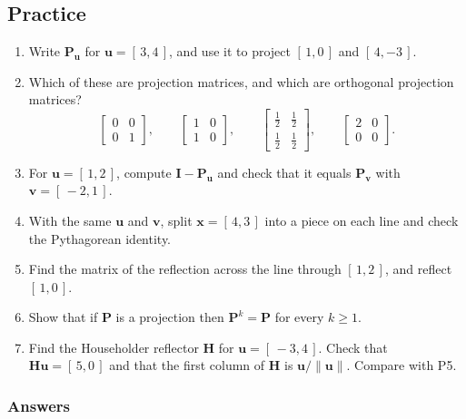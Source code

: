 \documentclass[11pt]{article}
\theoremstyle{plain}
\theoremstyle{definition}
\theoremstyle{remark}
\newcommand{\vc}[1]{\mathbf{#1}}
\newcommand{\mt}[1]{\mathbf{#1}}
\newcommand{\norm}[1]{\lVert #1\rVert}
\begin{document}
\subsection{Practice}
\begin{enumerate}[label=\textbf{P\arabic*.},leftmargin=2.6em,itemsep=5pt]
  \item Write $\mt{P}_{\vc{u}}$ for $\vc{u}=[\,3,4\,]$, and use it to project
        $[\,1,0\,]$ and $[\,4,-3\,]$.
  \item Which of these are projection matrices, and which are orthogonal
        projection matrices?
        \[
          \begin{bmatrix}0&0\\0&1\end{bmatrix},\qquad
          \begin{bmatrix}1&0\\1&0\end{bmatrix},\qquad
          \begin{bmatrix}\tfrac12&\tfrac12\\[2pt]\tfrac12&\tfrac12\end{bmatrix},\qquad
          \begin{bmatrix}2&0\\0&0\end{bmatrix}.
        \]
  \item For $\vc{u}=[\,1,2\,]$, compute $\mt{I}-\mt{P}_{\vc{u}}$ and check that it
        equals $\mt{P}_{\vc{v}}$ with $\vc{v}=[\,-2,1\,]$.
  \item With the same $\vc{u}$ and $\vc{v}$, split $\vc{x}=[\,4,3\,]$ into a piece
        on each line and check the Pythagorean identity.
  \item Find the matrix of the reflection across the line through $[\,1,2\,]$,
        and reflect $[\,1,0\,]$.
  \item Show that if $\mt{P}$ is a projection then $\mt{P}^{k}=\mt{P}$ for every
        $k\ge1$.
  \item Find the Householder reflector $\mt{H}$ for $\vc{u}=[\,-3,4\,]$. Check
        that $\mt{H}\vc{u}=[\,5,0\,]$ and that the first column of $\mt{H}$ is
        $\vc{u}/\norm{\vc{u}}$. Compare with P5.
\end{enumerate}

\subsubsection*{Answers}
\end{document}

